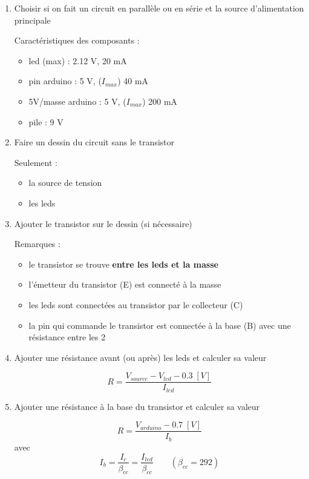 \documentclass[a4paper]{article}
\begin{document}
\begin{enumerate}


\item Choisir si on fait un circuit en parallèle ou en série et la source d'alimentation principale
\begin{example}
    Caractéristiques des composants :
    \begin{itemize}
        \item led (max) : 2.12 V, 20 mA
        \item pin arduino : 5 V, ($I_{max}$) 40 mA
        \item 5V/masse arduino : 5 V, ($I_{max}$) 200 mA
        \item pile : 9 V
    \end{itemize}
\end{example}


\item Faire un dessin du circuit sans le transistor
\begin{example}
    Seulement :
    \begin{itemize}
        \item la source de tension
        \item les leds
    \end{itemize}
\end{example}


\item Ajouter le transistor sur le dessin (si nécessaire)
\begin{example}
    Remarques :
    \begin{itemize}
        \item le transistor se trouve \textbf{entre les leds et la masse}
        \item l'émetteur du transistor (E) est connecté à la masse
        \item les leds sont connectées au transistor par le collecteur (C)
        \item la pin qui commande le transistor est connectée à la base (B) avec une résistance entre les 2
    \end{itemize}
\end{example}


\item Ajouter une résistance avant (ou après) les leds et calculer sa valeur
\begin{example}
    \[ R = \frac{V_{source} - V_{led} - 0.3 \; [V]}{I_{led}} \]
\end{example}


\item Ajouter une résistance à la base du transistor et calculer sa valeur
\begin{example}
\[ R = \frac{V_{arduino} - 0.7 \; [V]}{I_b} \]
avec
\[ I_b = \frac{I_c}{\beta_{cc}} = \frac{I_{led}}{\beta_{cc}} \qquad (\beta_{cc} = 292) \]
\end{example}



\end{enumerate}
\end{document}
